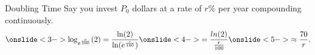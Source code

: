\documentclass[Lecture.tex]{subfiles}
\begin{document}
\begin{frame}{Doubling Time}
  Say you invest $P_0$ dollars at a rate of $r\%$ per year compounding continuously.
  $$\onslide<3->{\log_{e^{\frac{r}{100}}}(2) = \frac{\ln(2)}{\ln(e^{\frac{r}{100}})}}\onslide<4->{ = \frac{ln(2)}{\frac{r}{100}}}\onslide<5->{ \approx \frac{70}{r}.}$$
\end{frame}
\end{document}
